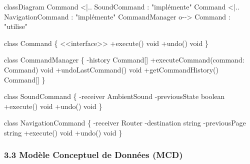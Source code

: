\documentclass[
]{article}
\newenvironment{Shaded}{}{}
\newcommand{\NormalTok}[1]{#1}
\begin{document}
\begin{Shaded}
\begin{Highlighting}[]
\NormalTok{classDiagram}
\NormalTok{    Command \textless{}|.. SoundCommand : "implémente"}
\NormalTok{    Command \textless{}|.. NavigationCommand : "implémente"}
\NormalTok{    CommandManager o{-}{-}\textgreater{} Command : "utilise"}
    
\NormalTok{    class Command \{}
\NormalTok{        \textless{}\textless{}interface\textgreater{}\textgreater{}}
\NormalTok{        +execute() void}
\NormalTok{        +undo() void}
\NormalTok{    \}}
    
\NormalTok{    class CommandManager \{}
\NormalTok{        {-}history Command[]}
\NormalTok{        +executeCommand(command: Command) void}
\NormalTok{        +undoLastCommand() void}
\NormalTok{        +getCommandHistory() Command[]}
\NormalTok{    \}}
    
\NormalTok{    class SoundCommand \{}
\NormalTok{        {-}receiver AmbientSound}
\NormalTok{        {-}previousState boolean}
\NormalTok{        +execute() void}
\NormalTok{        +undo() void}
\NormalTok{    \}}
    
\NormalTok{    class NavigationCommand \{}
\NormalTok{        {-}receiver Router}
\NormalTok{        {-}destination string}
\NormalTok{        {-}previousPage string}
\NormalTok{        +execute() void}
\NormalTok{        +undo() void}
\NormalTok{    \}}
\end{Highlighting}
\end{Shaded}

\subsubsection{3.3 Modèle Conceptuel de Données
(MCD)}\label{moduxe8le-conceptuel-de-donnuxe9es-mcd}
\end{document}
